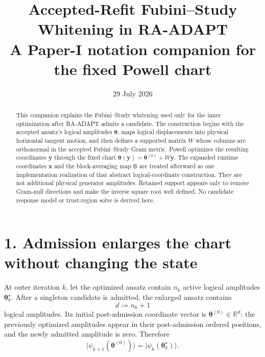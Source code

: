 \documentclass[11pt]{article}
\title{Accepted-Refit Fubini--Study Whitening in RA-ADAPT\\
\large A Paper-I notation companion for the fixed Powell chart}
\author{}
\date{29 July 2026}
\newcommand{\ket}[1]{\lvert #1\rangle}
\newcommand{\R}{\mathbb R}
\begin{document}
\maketitle
\vspace{-1.25em}

\begin{abstract}
This companion explains the Fubini--Study whitening used only for the inner
optimization after RA-ADAPT admits a candidate.  The construction begins with
the accepted ansatz's logical amplitudes
\(\boldsymbol\theta\), maps logical displacements into physical horizontal
tangent motion, and then defines a supported matrix \(W\) whose columns are
orthonormal in the accepted Fubini--Study Gram metric.  Powell optimizes the
resulting coordinates \(\mathbf y\) through the fixed chart
\(\boldsymbol\theta(\mathbf y)
=\boldsymbol\theta^{(0)}+W\mathbf y\).
The expanded runtime coordinates \(\mathbf x\) and the block-averaging map
\(\mathsf B\) are treated afterward as one implementation realization of that
abstract logical-coordinate construction.  They are not additional physical
generator amplitudes.  Retained support appears only to remove Gram-null
directions and make the inverse square root well defined.  No candidate
response model or trust-region solve is derived here.
\end{abstract}

\noindent{}

\section*{1. Admission enlarges the chart without changing the state}

At outer iteration \(k\), let the optimized ansatz contain \(n_k\) active
logical amplitudes
\(\boldsymbol\theta_k^\star\).
After a singleton candidate is admitted, the enlarged ansatz contains
\begin{equation}
d:=n_k+1
\label{eq:logical-dimension}
\end{equation}
logical amplitudes.  Its initial post-admission coordinate vector is
\(\boldsymbol\theta^{(0)}\in\R^d\): the previously optimized amplitudes appear
in their post-admission ordered positions, and the newly admitted amplitude
is zero.  Therefore
\begin{equation}
\ket{\psi_{k+1}(\boldsymbol\theta^{(0)})}
=
\ket{\psi_k(\boldsymbol\theta_k^\star)}.
\label{eq:zero-growth}
\end{equation}
\end{document}
